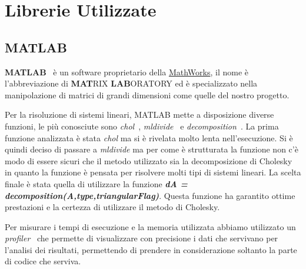 \documentclass[a4paper,12pt,titlepage,oneside]{book}
\begin{document}
    \section{Librerie Utilizzate}
        \subsection{MATLAB}
        \noindent \textbf{MATLAB}~\cite{matlab} è un software proprietario della \href{https://www.mathworks.com}{MathWorks}, il nome è l'abbreviazione di \textbf{MAT}RIX \textbf{LAB}ORATORY ed è specializzato nella manipolazione di matrici di grandi dimensioni come quelle del nostro progetto. 
        
        Per la risoluzione di sistemi lineari, MATLAB mette a disposizione diverse funzioni, le più conosciute sono \textit{chol}~\cite{cholmatlab},  \textit{mldivide}~\cite{mldividematlab} e \textit{decomposition}~\cite{decompositionmatlab}. La prima funzione analizzata è stata \textit{chol} ma si è rivelata molto lenta nell'esecuzione. Si è quindi deciso di passare a \textit{mldivide} ma per come è strutturata la funzione non c'è modo di essere sicuri che il metodo utilizzato sia la decomposizione di Cholesky in quanto la funzione è pensata per risolvere molti tipi di sistemi lineari. La scelta finale è stata quella di utilizzare la funzione \textit{\textbf{dA = decomposition(A,type,triangularFlag)}}. Questa funzione ha garantito ottime prestazioni e la certezza di utilizzare il metodo di Cholesky.\\[0.5cm]
        
        
        
        \vspace{0.5cm}
    	
    	\noindent Per misurare i tempi di esecuzione e la memoria utilizzata abbiamo utilizzato un \textit{profiler}~\cite{profilermatlab} che permette di visualizzare con precisione i dati che servivano per l'analisi dei risultati, permettendo di prendere in considerazione soltanto la parte di codice che serviva.
        
        \newpage
\end{document}
